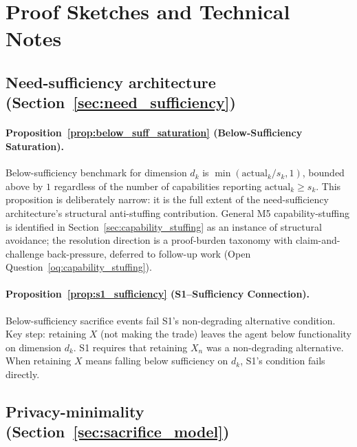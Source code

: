 \section{Proof Sketches and Technical Notes}
\label{app:proofs}

\subsection{Need-sufficiency architecture
(Section~\ref{sec:need_sufficiency})}

\paragraph{Proposition~\ref{prop:below_suff_saturation}
(Below-Sufficiency Saturation).}
Below-sufficiency benchmark for dimension $d_k$ is
$\min(\mathrm{actual}_k / s_k, 1)$, bounded above by $1$
regardless of the number of capabilities reporting
$\mathrm{actual}_k \geq s_k$.  This proposition is deliberately
narrow: it is the full extent of the need-sufficiency
architecture's structural anti-stuffing contribution.  General
M5 capability-stuffing is identified in
Section~\ref{sec:capability_stuffing} as an instance of
structural avoidance; the resolution direction is a proof-burden
taxonomy with claim-and-challenge back-pressure, deferred to
follow-up work (Open Question~\ref{oq:capability_stuffing}).

\paragraph{Proposition~\ref{prop:s1_sufficiency}
(S1--Sufficiency Connection).}
Below-sufficiency sacrifice events fail S1's non-degrading
alternative condition.  Key step: retaining $X$ (not making the
trade) leaves the agent below functionality on dimension $d_k$.
S1 requires that retaining $X_n$ was a non-degrading
alternative.  When retaining $X$ means falling below sufficiency
on $d_k$, S1's condition fails directly.

\subsection{Privacy-minimality
(Section~\ref{sec:sacrifice_model})}


